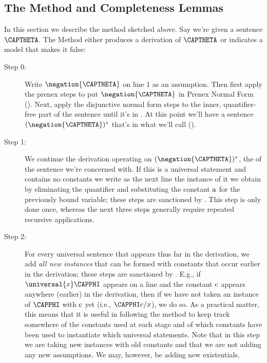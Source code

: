 \subsection{The Method and Completeness Lemmas}\label{The Method Section}
In this section we describe the method sketched above. 
Say we're given a sentence $\CAPTHETA$. The Method either produces a derivation of $\CAPTHETA$ or indicates a model that makes it false:

\begin{description}
\item[Step 0:] Write $\negation{\CAPTHETA}$ on line 1 as an assumption.
Then first apply the prenex steps to put $\negation{\CAPTHETA}$ in Prenex Normal Form (). 
Next, apply the disjunctive normal form steps to the inner, quantifier-free part of the sentence until it's in . 
At this point we'll have a sentence $(\negation{\CAPTHETA})^*$ that's in what we'll call  ().  

\item[Step 1:] We continue the derivation operating on $(\negation{\CAPTHETA})^*$, the  of the sentence we're concerned with. 
If this  is a universal statement and contains no constants we write as the next line the instance of it we obtain by eliminating the quantifier and substituting the constant $\mathrm{a}$ for the previously bound variable;
these steps are sanctioned by .
This step is only done once, whereas the next three steps generally require repeated recursive applications. 

\item[Step 2:] For every universal sentence that appears thus far in the derivation, we add \emph{all new instances} that can be formed with constants that occur earlier in the derivation;
these steps are sanctioned by .
E.g., if $\universal{\variable{x}}\CAPPHI$ appears on a line and the constant $\mathrm{c}$ appears anywhere (earlier) in the derivation, then if we have not taken an instance of $\CAPPHI$ with $\mathrm{c}$ yet (i.e., $\CAPPHI\constant{c}/\variable{x}$), we do so.
As a practical matter, this means that it is useful in following the method to keep track somewhere of the constants used at each stage and of which constants have been used to instantiate which universal statements.
Note that in this step we are taking new instances with old constants and that we are not adding any new assumptions. 
We may, however, be adding new existentials. 


\end{description}
